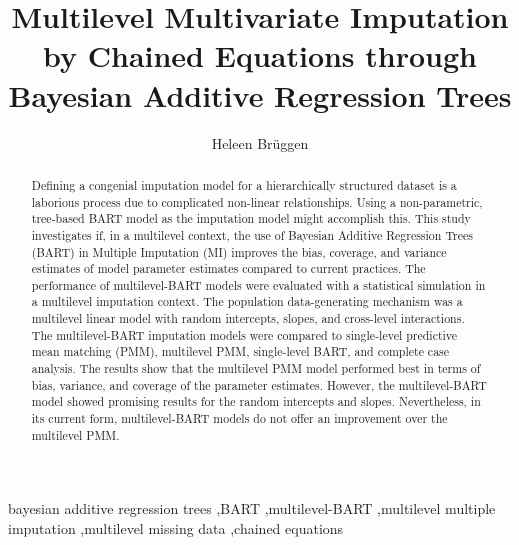 \documentclass[3p,12pt,a4paper]{elsarticle}
\begin{document}
\begin{frontmatter}
\title{Multilevel Multivariate Imputation by Chained Equations through Bayesian Additive Regression Trees}

\author[1]{Heleen Brüggen}



\begin{abstract} %
    Defining a congenial imputation model for a hierarchically structured dataset is a laborious process due to complicated non-linear relationships. Using a non-parametric, tree-based BART model as the imputation model might accomplish this. This study investigates if, in a multilevel context, the use of Bayesian Additive Regression Trees (BART) in Multiple Imputation (MI) improves the bias, coverage, and variance estimates of model parameter estimates compared to current practices. The performance of multilevel-BART models were evaluated with a statistical simulation in a multilevel imputation context. The population data-generating mechanism was a multilevel linear model with random intercepts, slopes, and cross-level interactions. The multilevel-BART imputation models were compared to single-level predictive mean matching (PMM), multilevel PMM, single-level BART, and complete case analysis. The results show that the multilevel PMM model performed best in terms of bias, variance, and coverage of the parameter estimates. However, the multilevel-BART model showed promising results for the random intercepts and slopes. Nevertheless, in its current form, multilevel-BART models do not offer an improvement over the multilevel PMM.
\end{abstract}

\begin{keyword} %
    bayesian additive regression trees \sep BART \sep multilevel-BART \sep multilevel multiple imputation \sep multilevel missing data \sep chained equations
\end{keyword}
\end{frontmatter}
\end{document}
